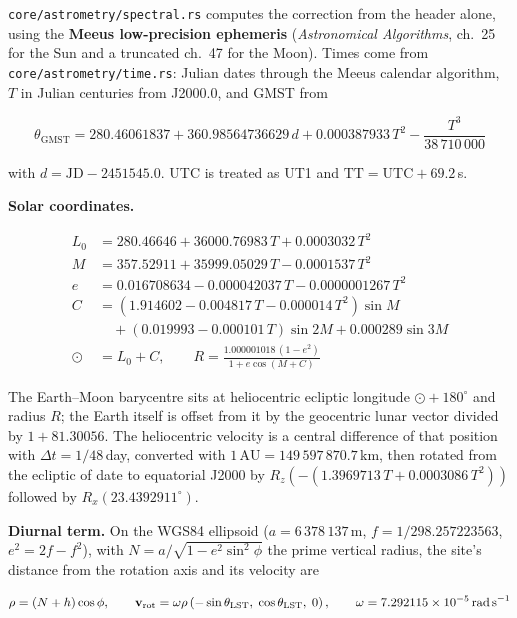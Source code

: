 \documentclass[11pt,a4paper]{article}
\newcommand{\code}[1]{\texttt{\small #1}}
\begin{document}
    \code{core/astrometry/spectral.rs} computes the correction from the header alone, using the \textbf{Meeus low-precision ephemeris} (\emph{Astronomical Algorithms}, ch.~25 for the Sun and a truncated ch.~47 for the Moon). Times come from \code{core/astrometry/time.rs}: Julian dates through the Meeus calendar algorithm, $T$ in Julian centuries from J2000.0, and GMST from

    \begin{equation}
        \theta_{\text{GMST}} = 280.46061837 + 360.98564736629\,d + 0.000387933\,T^2 - \frac{T^3}{38\,710\,000}
    \end{equation}

    with $d = \text{JD} - 2451545.0$. UTC is treated as UT1 and $\text{TT} = \text{UTC} + 69.2$\,s.

    \textbf{Solar coordinates.}

    \begin{align}
        L_0 &= 280.46646 + 36000.76983\,T + 0.0003032\,T^2 \\
        M &= 357.52911 + 35999.05029\,T - 0.0001537\,T^2 \\
        e &= 0.016708634 - 0.000042037\,T - 0.0000001267\,T^2 \\
        C &= (1.914602 - 0.004817\,T - 0.000014\,T^2)\sin M \nonumber \\
        &\quad + (0.019993 - 0.000101\,T)\sin 2M + 0.000289 \sin 3M \\
        \odot &= L_0 + C, \qquad R = \frac{1.000001018\,(1 - e^2)}{1 + e \cos(M + C)}
    \end{align}

    The Earth--Moon barycentre sits at heliocentric ecliptic longitude $\odot + 180^{\circ}$ and radius $R$; the Earth itself is offset from it by the geocentric lunar vector divided by $1 + 81.30056$. The heliocentric velocity is a central difference of that position with $\Delta t = 1/48$\,day, converted with $1\,\text{AU} = 149\,597\,870.7$\,km, then rotated from the ecliptic of date to equatorial J2000 by $R_z\!\left(-(1.3969713\,T + 0.0003086\,T^2)\right)$ followed by $R_x(23.4392911^{\circ})$.

    \textbf{Diurnal term.} On the WGS84 ellipsoid ($a = 6\,378\,137$\,m, $f = 1/298.257223563$, $e^2 = 2f - f^2$), with $N = a / \sqrt{1 - e^2 \sin^2\phi}$ the prime vertical radius, the site's distance from the rotation axis and its velocity are

    \begin{equation}
        \rho = (N + h)\cos\phi, \qquad
        \mathbf{v}_{\text{rot}} = \omega \rho \left(-\sin\theta_{\text{LST}},\; \cos\theta_{\text{LST}},\; 0\right),
        \qquad \omega = 7.292115 \times 10^{-5}\,\text{rad\,s}^{-1}
    \end{equation}
\end{document}
